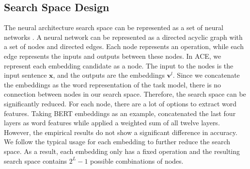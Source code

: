 \documentclass[11pt,a4paper]{article}
\def\vv{{\bm{v}}}
\def\vx{{\bm{x}}}
\begin{document}
\subsection{Search Space Design}
\label{sec:search_space}
The neural architecture search space can be represented as a set of neural networks \citep{elsken2019neural}. 
A neural network can be represented as a directed acyclic graph with a set of nodes and directed edges.
Each node represents an operation, while each edge represents the inputs and outputs between these nodes. 
In ACE, we represent each embedding candidate as a node. 
The input to the nodes is the input sentence $\vx$, and the outputs are the embeddings $\vv^l$. Since we concatenate the embeddings as the word representation of the task model, there is no connection between nodes in our search space. Therefore, the search space can be significantly reduced. 
For each node, there are a lot of options to extract word features. 
Taking BERT embeddings as an example, \citet{devlin-etal-2019-bert} concatenated the last four layers as word features while \citet{kondratyuk-straka-2019-75} applied a weighted sum of all twelve layers. However, the empirical results \citep{devlin-etal-2019-bert} do not show a significant difference in accuracy. We follow the typical usage for each embedding to further reduce the search space. As a result, each embedding only has a fixed operation and the resulting search space contains $2^L{-}1$ possible combinations of nodes.
\end{document}
